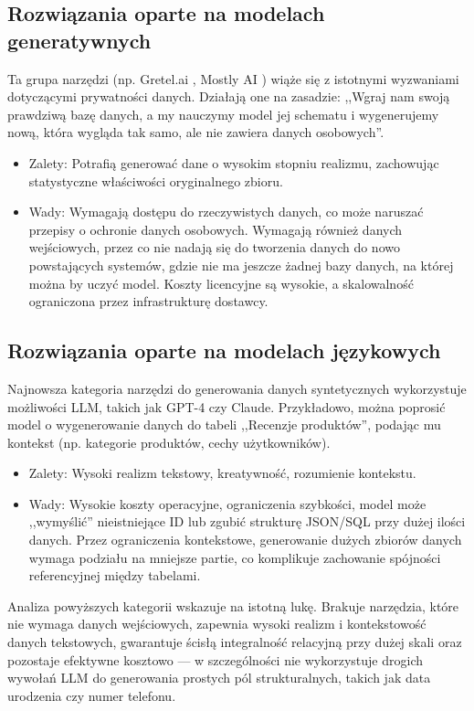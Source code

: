 \subsection*{Rozwiązania oparte na modelach generatywnych}
Ta grupa narzędzi (np. Gretel.ai \cite{gretel_platform}, Mostly AI \cite{mostly}) wiąże się z istotnymi wyzwaniami dotyczącymi prywatności danych. Działają one na zasadzie: ,,Wgraj nam swoją prawdziwą bazę danych, a my nauczymy model jej schematu i wygenerujemy nową, która wygląda tak samo, ale nie zawiera danych osobowych''.
\begin{itemize}
    \item Zalety: Potrafią generować dane o wysokim stopniu realizmu, zachowując statystyczne właściwości oryginalnego zbioru.
    \item Wady: Wymagają dostępu do rzeczywistych danych, co może naruszać przepisy o ochronie danych osobowych. Wymagają również danych wejściowych, przez co nie nadają się do tworzenia danych do nowo powstających systemów, gdzie nie ma jeszcze żadnej bazy danych, na której można by uczyć model. Koszty licencyjne są wysokie, a skalowalność ograniczona przez infrastrukturę dostawcy.
\end{itemize}

\subsection*{Rozwiązania oparte na modelach językowych}
Najnowsza kategoria narzędzi do generowania danych syntetycznych wykorzystuje możliwości \gls{LLM}, takich jak GPT-4 czy Claude. Przykładowo, można poprosić model o wygenerowanie danych do tabeli ,,Recenzje produktów'', podając mu kontekst (np. kategorie produktów, cechy użytkowników).
\begin{itemize}
    \item Zalety: Wysoki realizm tekstowy, kreatywność, rozumienie kontekstu.
    \item Wady: Wysokie koszty operacyjne, ograniczenia szybkości, model może ,,wymyślić'' nieistniejące ID lub zgubić strukturę \gls{JSON}/\gls{SQL} przy dużej ilości danych. Przez ograniczenia kontekstowe, generowanie dużych zbiorów danych wymaga podziału na mniejsze partie, co komplikuje zachowanie spójności referencyjnej między tabelami.
\end{itemize}

Analiza powyższych kategorii wskazuje na istotną lukę. Brakuje narzędzia, które nie wymaga danych wejściowych, zapewnia wysoki realizm i kontekstowość danych tekstowych, gwarantuje ścisłą integralność relacyjną przy dużej skali oraz pozostaje efektywne kosztowo --- w szczególności nie wykorzystuje drogich wywołań \gls{LLM} do generowania prostych pól strukturalnych, takich jak data urodzenia czy numer telefonu.

